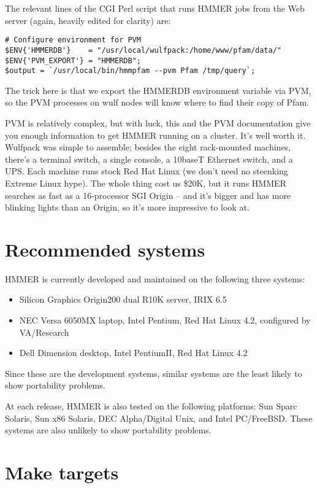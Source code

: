The relevant lines of the CGI Perl script that runs HMMER jobs from
the Web server (again, heavily edited for clarity) are:

\begin{verbatim}
# Configure environment for PVM
$ENV{'HMMERDB'}    = "/usr/local/wulfpack:/home/www/pfam/data/"
$ENV{'PVM_EXPORT'} = "HMMERDB";
$output = `/usr/local/bin/hmmpfam --pvm Pfam /tmp/query`;
\end{verbatim}

The trick here is that we export the HMMERDB environment variable via
PVM, so the PVM processes on wulf nodes will know where to find their
copy of Pfam.

PVM is relatively complex, but with luck, this and the PVM
documentation give you enough information to get HMMER running on a
cluster. It's well worth it.  Wulfpack was simple to assemble; besides
the eight rack-mounted machines, there's a terminal switch, a single
console, a 10baseT Ethernet switch, and a UPS. Each machine runs stock
Red Hat Linux (we don't need no steenking Extreme Linux hype). The
whole thing cost us \$20K, but it runs HMMER searches as fast as a
16-processor SGI Origin -- and it's bigger and has more blinking
lights than an Origin, so it's more impressive to look at.

\section{Recommended systems}

HMMER is currently developed and maintained on the following three
systems:

\begin{itemize}
\item Silicon Graphics Origin200 dual R10K server, IRIX 6.5
\item NEC Versa 6050MX laptop, Intel Pentium, 
      Red Hat Linux 4.2, configured by VA/Research
\item Dell Dimension desktop, Intel PentiumII, Red Hat
      Linux 4.2
\end{itemize}

Since these are the development systems, similar systems are the least
likely to show portability problems.

At each release, HMMER is also tested on the following platforms: Sun
Sparc Solaris, Sun x86 Solaris, DEC Alpha/Digital Unix, and Intel
PC/FreeBSD. These systems are also unlikely to show portability
problems.

\section{Make targets}

